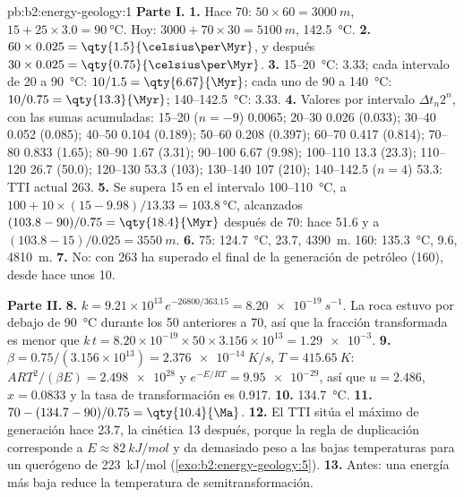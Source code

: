 \begin{solution}{pb:b2:energy-geology:1}
\noindent\textbf{Parte I.}
\textbf{1.} Hace \qty{70}{\Ma}: $50 \times 60 = \qty{3000}{m}$, $15 + 25 \times 3.0 =
\qty{90}{\celsius}$. Hoy: $3000 + 70 \times 30 = \qty{5100}{m}$, \qty{142.5}{\celsius}.
\textbf{2.} $60 \times 0.025 = \qty{1.5}{\celsius\per\Myr}$, y después $30 \times 0.025 =
\qty{0.75}{\celsius\per\Myr}$.
\textbf{3.} 15--\qty{20}{\celsius}: \qty{3.33}{\Myr}; cada intervalo de 20 a \qty{90}{\celsius}:
$10/1.5 = \qty{6.67}{\Myr}$; cada uno de 90 a \qty{140}{\celsius}: $10/0.75 = \qty{13.3}{\Myr}$;
140--\qty{142.5}{\celsius}: \qty{3.33}{\Myr}.
\textbf{4.} Valores por intervalo $\Delta t_n 2^n$, con las sumas acumuladas: 15--20 ($n = -9$) 0.0065; 20--30
0.026 (0.033); 30--40 0.052 (0.085); 40--50 0.104 (0.189); 50--60 0.208 (0.397); 60--70 0.417
(0.814); 70--80 0.833 (1.65); 80--90 1.67 (3.31); 90--100 6.67 (9.98); 100--110 13.3 (23.3);
110--120 26.7 (50.0); 120--130 53.3 (103); 130--140 107 (210); 140--142.5 ($n = 4$) 53.3: TTI
actual 263.
\textbf{5.} Se supera 15 en el intervalo 100--\qty{110}{\celsius}, a $100 + 10 \times
(15 - 9.98)/13.33 = \qty{103.8}{\celsius}$, alcanzados $(103.8 - 90)/0.75 = \qty{18.4}{\Myr}$ después de
\qty{70}{\Ma}: hace \qty{51.6}{\Ma} y a $(103.8 - 15)/0.025 = \qty{3550}{m}$.
\textbf{6.} 75: \qty{124.7}{\celsius}, \qty{23.7}{\Ma}, \qty{4390}{m}. 160: \qty{135.3}{\celsius},
\qty{9.6}{\Ma}, \qty{4810}{m}.
\textbf{7.} No: con 263 ha superado el final de la generación de petróleo (160), desde hace unos \qty{10}{\Ma}.

\noindent\textbf{Parte II.}
\textbf{8.} $k = 9.21 \times 10^{13}\,e^{-26800/363.15} = \qty{8.20e-19}{s^{-1}}$. La roca estuvo
por debajo de \qty{90}{\celsius} durante los \qty{50}{\Myr} anteriores a \qty{70}{\Ma}, así que la fracción transformada es
menor que $k\,t = 8.20 \times 10^{-19} \times 50 \times 3.156 \times 10^{13} = \num{1.29e-3}$.
\textbf{9.} $\beta = 0.75/(3.156 \times 10^{13}) = \qty{2.376e-14}{K/s}$, $T = \qty{415.65}{K}$:
$ART^2/(\beta E) = \num{2.498e28}$ y $e^{-E/RT} = \num{9.95e-29}$, así que $u = 2.486$, $x = 0.0833$ y
la tasa de transformación es 0.917.
\textbf{10.} \qty{134.7}{\celsius}.
\textbf{11.} $70 - (134.7 - 90)/0.75 = \qty{10.4}{\Ma}$.
\textbf{12.} El TTI sitúa el máximo de generación hace \qty{23.7}{\Ma}, la cinética \qty{13}{\Myr} después,
porque la regla de duplicación corresponde a $E \approx \qty{82}{kJ/mol}$ y da demasiado peso a las bajas
temperaturas para un querógeno de \qty{223}{kJ/mol} (\cref{exo:b2:energy-geology:5}).
\textbf{13.} Antes: una energía más baja reduce la temperatura de semitransformación.


\end{solution}
